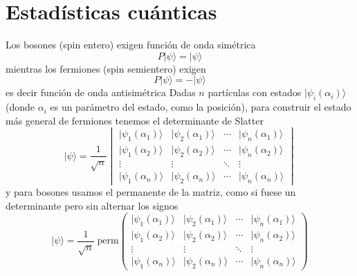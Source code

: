 \section{Estadísticas cuánticas}
  Los bosones (spin entero) exigen función de onda simétrica 
\begin{equation}
  P |\psi\rangle = |\psi\rangle
\end{equation}
mientras los fermiones (spin semientero) exigen
\begin{equation}
 P |\psi\rangle = - |\psi\rangle
\end{equation}
es decir función de onda antisimétrica
Dadas $n$ partículas con estados $|\psi_i(\alpha_i)\rangle$ (donde $\alpha_i$ es un parámetro del estado, como la posición), para construir el estado más general de fermiones tenemos el determinante de Slatter
\begin{equation}
  |\psi\rangle = \frac{1}{\sqrt{n}} \begin{vmatrix} |\psi_1(\alpha_1)\rangle & |\psi_2(\alpha_1)\rangle & \cdots & |\psi_n(\alpha_1)\rangle \\  |\psi_1(\alpha_2)\rangle & |\psi_2(\alpha_2)\rangle & \cdots & |\psi_n(\alpha_2)\rangle \\ \vdots & \vdots & \ddots & \vdots \\  |\psi_1(\alpha_n)\rangle & |\psi_2(\alpha_n)\rangle & \cdots & |\psi_n(\alpha_n)\rangle \end{vmatrix}
\end{equation}
y para bosones usamos el permanente de la matriz, como si fuese un determinante pero sin alternar los signos
\begin{equation}
   |\psi\rangle = \frac{1}{\sqrt{n}}\; \text{perm}\begin{pmatrix} |\psi_1(\alpha_1)\rangle & |\psi_2(\alpha_1)\rangle & \cdots & |\psi_n(\alpha_1)\rangle \\  |\psi_1(\alpha_2)\rangle & |\psi_2(\alpha_2)\rangle & \cdots & |\psi_n(\alpha_2)\rangle \\ \vdots & \vdots & \ddots & \vdots \\  |\psi_1(\alpha_n)\rangle & |\psi_2(\alpha_n)\rangle & \cdots & |\psi_n(\alpha_n)\rangle \end{pmatrix}
\end{equation}



